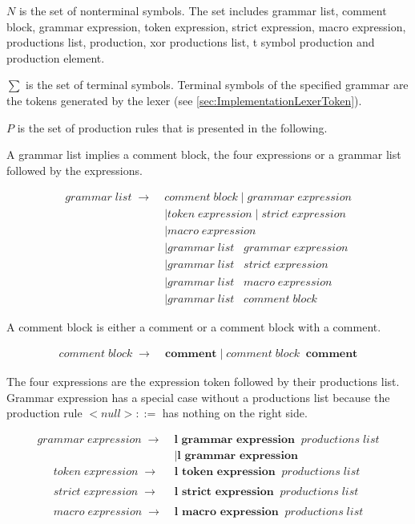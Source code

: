 $N$ is the set of nonterminal symbols. The set includes grammar list, comment block, grammar expression, token expression, strict expression, macro expression, productions list, production, xor productions list, t symbol production and production element.

$\sum$ is the set of terminal symbols. Terminal symbols of the specified grammar are the tokens generated by the lexer (see \ref{sec:ImplementationLexerToken}).

$P$ is the set of production rules that is presented in the following. 

A grammar list implies a comment block, the four expressions or a grammar list followed by the expressions.

\begin{align*}
	grammar\;list\; \rightarrow\; &comment\;block
	     		\mid grammar\;expression  \\
			   &\mid token\;expression
                \mid strict\;expression\\
               &\mid macro\;expression \\
               &\mid grammar\;list\;\;\;grammar\;expression\\
               &\mid grammar\;list\;\;\;strict\;expression \\
               &\mid grammar\;list\;\;\;macro\;expression \\
               &\mid grammar\;list\;\;\;comment\;block               
\end{align*}

A comment block is either a comment or a comment block with a comment.

\begin{align*}
    comment\;block\; \rightarrow\; &\textbf{comment}
                \mid comment\;block\;\;\textbf{comment}
\end{align*}

The four expressions are the expression token followed by their productions list. Grammar expression has a special case without a productions list because the production rule $ <null> ::= $ has nothing on the right side. 

\begin{align*}
	grammar\;expression\; \rightarrow\; &\textbf{l grammar expression}\;\;productions\;list \\ 
               &\mid \textbf{l grammar expression} 
\end{align*}
\begin{align*}        
	token\;expression\; \rightarrow\; &\textbf{l token expression} \;\;productions\;list \\ \\
	strict\;expression\; \rightarrow\; &\textbf{l strict expression} \;\;productions\;list \\ \\
	macro\;expression\; \rightarrow\; &\textbf{l macro expression} \;\;productions\;list 
\end{align*}

